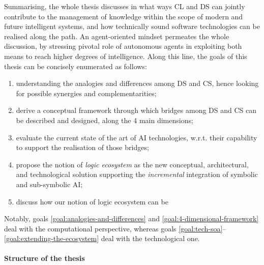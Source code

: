 \documentclass[12pt,a4paper,openright,twoside]{book}
\begin{document}
Summarising, the whole thesis discusses in what ways CL and DS can jointly contribute to the management of knowledge within the scope of modern and future intelligent systems, and how technically sound software technologies can be realised along the path.
%
An agent-oriented mindset permeates the whole discussion, by stressing pivotal role of autonomous agents in exploiting both means to reach higher degrees of intelligence.
%
Along this line, the goals of this thesis can be concisely enumerated as follows:
%
\begin{enumerate}
    \item\label{goal:analogies-and-differences} understanding the analogies and differences among DS and CS, hence looking for possible synergies and complementarities;

    \item\label{goal:4-dimensional-framework} derive a conceptual framework through which bridges among DS and CS can be described and designed, along the 4 main dimensions;

    \item\label{goal:tech-soa} evaluate the current state of the art of AI technologies, w.r.t. their capability to support the realisation of those bridges;

    \item\label{goal:logic-ecosystem} propose the notion of \emph{logic ecosystem} as the new conceptual, architectural, and technological solution supporting the \emph{incremental} integration of symbolic and sub-symbolic AI;

    \item\label{goal:extending-the-ecosystem} discuss how our notion of logic ecosystem can be
\end{enumerate}
%
Notably, goals \ref{goal:analogies-and-differences} and \ref{goal:4-dimensional-framework} deal with the computational perspective, whereas goals \ref{goal:tech-soa}--\ref{goal:extending-the-ecosystem} deal with the technological one.

\paragraph{Structure of the thesis}
\end{document}
